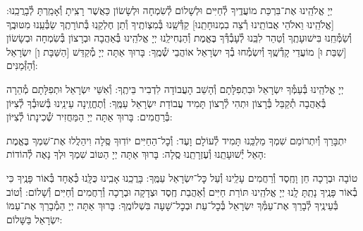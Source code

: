 \documentclass[twoside, openany, parskip=half, 11pt]{book}
\begin{document}
יְיָ אֱלֹהֵֽינוּ אֶת־בִּרְכַּת מוֹעֲדֶֽיךָ לְ֯חַיִּים וּלְשָׁלוֹם לְ֯שִׂמְחָה וּלְשָׂשׂוֹן כַּאֲשֶׁר רָצִֽיתָ וְ֯אָמַֽרְתָּ לְ֯בָרֲכֵֽנוּ: [\shabbos אֱלֹהֵֽינוּ וֵאלֹהֵי אֲבוֹתֵֽינוּ רְ֯צֵה בִמְנוּחָתֵֽנוּ] קַדְּ֯שֵֽׁנוּ בְּ֯מִצְוֹתֶֽיךָ וְ֯תֵן חֶלְקֵֽנוּ בְּ֯תוֹרָתֶֽךָ שַׂבְּ֯עֵֽנוּ מִטּוּבֶֽךָ וְ֯שַׂמְּ֯חֵֽנוּ בִּישׁוּעָתֶֽךָ וְ֯טַהֵר לִבֵּֽנוּ לְ֯עָבְ֯דְּ֯ךָ בֶּאֱמֶת וְ֯הַנְחִילֵֽנוּ יְיָ אֱלֹהֵֽינוּ בְּ֯אַהֲבָה וּבְרָצוֹן בְּ֯שִׂמְחָה וּבְשָׂשׂוֹן [\shabbos שַׁבַּת וּ] מוֹעֲדֵי קָדְ֯שֶֽׁךָ וְ֯יִשְׂמְ֯חוּ בְ֯ךָ יִשְׂרָאֵל אוֹהֲבֵי שְׁ֯מֶֽךָ: בָּרוּךְ אַתָּה יְיָ מְ֯קַדֵּשׁ
[\shabbos הַשַּׁבָּת וְ] יִשְׂרָאֵל וְ֯הַזְּ֯מַנִּים:


יְיָ אֱלֹהֵֽינוּ בְּ֯עַמְּ֯ךָ יִשְׂרָאֵל וּבִתְפִלָּתָם וְ֯הָשֵׁב הָעֲבוֹדָה לִדְבִיר בֵּיתֶֽךָ: וְ֯אִשֵּׁי יִשְׂרָאֵל וּתְפִלָּתָם מְ֯הֵרָה בְּ֯אַהֲבָה תְ֯קַבֵּל בְּ֯רָצוֹן וּתְהִי לְ֯רָצוֹן תָּמִיד עֲבוֹדַת יִשְׂרָאֵל עַמֶּֽךָ: וְ֯תֶחֱזֶֽינָה עֵינֵֽינוּ בְּ֯שׁוּבְ֯ךָ לְ֯צִיּוֹן בְּ֯רַחֲמִים: בָּרוּךְ אַתָּה יְיָ הַמַּחֲזִיר שְׁ֯כִינָתוֹ לְ֯צִיּוֹן:

\modim


\clearpage

\vspace{-\baselineskip}
יִתְבָּרַךְ וְ֯יִתְרוֹמַם שִׁמְךָ מַלְכֵּֽנוּ תָּמִיד לְ֯עוֹלָם וָעֶד: וְ֯כׇל־הַחַיִּים יוֹדֽוּךָ סֶּֽלָה וִיהַלֲלוּ אֶת־שִׁמְךָ בֶּאֱמֶת הָאֵל יְ֯שׁוּעָתֵֽנוּ וְ֯עֶזְרָתֵֽנוּ סֶֽלָה: בָּרוּךְ אַתָּה יְיָ הַטּוֹב שִׁמְךָ וּלְךָ נָאֶה לְ֯הוֹדוֹת:



טוֹבָה וּבְרָכָה חֵן וָחֶֽסֶד וְ֯רַחֲמִים עָלֵֽינוּ וְ֯עַל כׇּל־יִשְׂרָאֵל עַמֶּֽךָ: בָּרֲכֵֽנוּ אָבִֽינוּ כֻּלָּֽנוּ כְּ֯אֶחָד בְּ֯אוֹר פָּנֶֽיךָ כִּי בְ֯אוֹר פָּנֶֽיךָ נָתַֽתָּ לָֽנוּ יְיָ אֱלֹהֵֽינוּ תּוֹרַת חַיִּים וְ֯אַהֲבַת חֶֽסֶד וּצְדָקָה וּבְרָכָה וְ֯רַחֲמִים וְ֯חַיִּים וְ֯שָׁלוֹם: וְ֯טוֹב בְּ֯עֵינֶֽיךָ לְ֯בָרֵךְ אֶת־עַמְּ֯ךָ יִשְׂרָאֵל בְּ֯כׇל־עֵת וּבְכׇל־שָׁעָה בִּשְׁלוֹמֶֽךָ: בָּרוּךְ אַתָּה יְיָ הַמְ֯בָרֵךְ אֶת־עַמּוֹ יִשְׂרָאֵל בַּשָּׁלוֹם:

\tachanunim

\vfill


\\

\sepline
\end{document}
